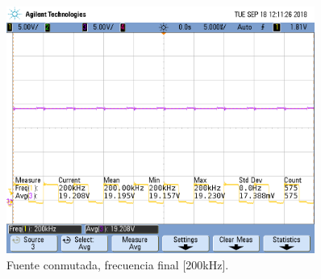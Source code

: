 \begin{figure}[H]
	\centering
	\includegraphics[width=0.9\textwidth]{Imagenes/tp3_labo5.png}
\caption{Fuente conmutada, frecuencia final [200kHz].}
	\label{fig:fcon200}
\end{figure}
 
